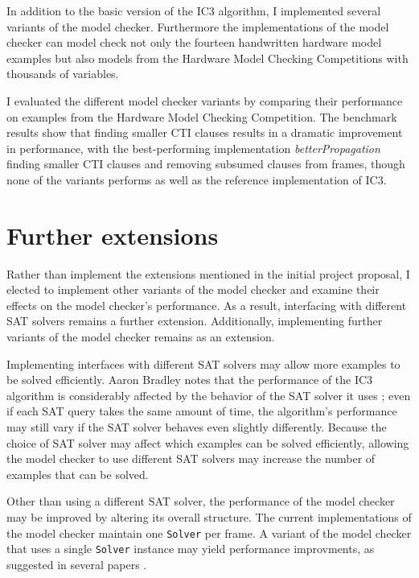 \documentclass[12pt,a4paper,twoside,openright]{report}
\begin{document}
{In addition to the basic version of the IC3 algorithm, I implemented several variants of the model checker.
Furthermore the implementations of the model checker can model check not only
the fourteen handwritten hardware model examples but also models from the
Hardware Model Checking Competitions with thousands of variables.

I evaluated the different model checker variants by comparing their performance on examples from
the Hardware Model Checking Competition. The benchmark results show that finding smaller CTI clauses
results in a dramatic improvement in performance, with the best-performing implementation
\emph{betterPropagation} finding smaller CTI clauses and removing subsumed clauses from frames,
though none of the variants performs as well as the reference implementation of IC3.

\section{Further extensions}
Rather than implement the extensions mentioned in the initial project proposal, I elected to implement
other variants of the model checker and examine their effects on the model checker's performance.
As a result, interfacing with different SAT solvers remains a further extension. Additionally,
implementing further variants of the model checker remains as an extension.

Implementing interfaces with different SAT solvers may allow more examples to be solved efficiently.
Aaron Bradley notes that the performance of the IC3 algorithm is considerably affected
by the behavior of the SAT solver it uses \cite{bradley12}; even if each SAT query takes the same amount of
time, the algorithm's performance may still vary if the SAT solver behaves even slightly differently.
Because the choice of SAT solver may affect which examples can be solved efficiently, allowing the model
checker to use different SAT solvers may increase the number of examples that can be solved.

Other than using a different SAT solver, the performance of the model checker may be improved by
altering its overall structure. The current implementations of the model checker maintain one
\verb,Solver, per frame. A variant of the model checker that uses a single \verb,Solver,
instance may yield performance improvments, as suggested in several papers \cite{}.




}
\end{document}
